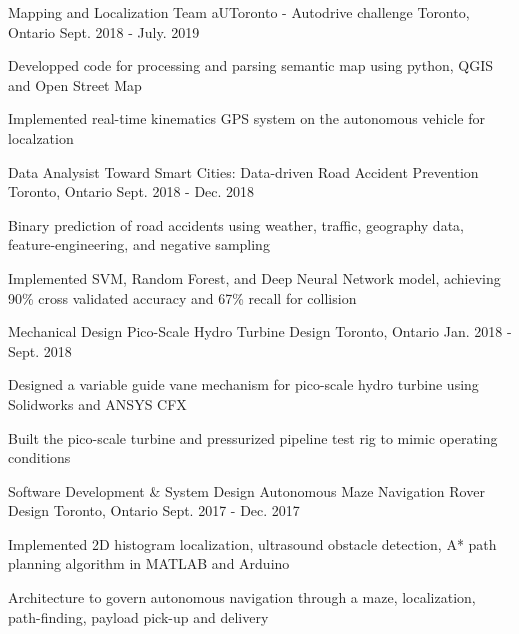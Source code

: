 \begin{cventries}
  \cventry
  {Mapping and Localization Team}
  {aUToronto - Autodrive challenge}
  {Toronto, Ontario}
  {Sept. 2018 - July. 2019}
  {
    \begin{cvitems}
      \item {Developped code for processing and parsing semantic map using python, QGIS and Open Street Map}
      \item {Implemented real-time kinematics GPS system on the autonomous vehicle for localzation}
    \end{cvitems}
  }

  \cventry
  {Data Analysist}
  {Toward Smart Cities: Data-driven Road Accident Prevention}
  {Toronto, Ontario}
  {Sept. 2018 - Dec. 2018}
  {
    \begin{cvitems}
      \item {Binary prediction of road accidents using weather, traffic, geography data, feature-engineering, and negative sampling}
      \item {Implemented SVM, Random Forest, and Deep Neural Network model, achieving 90\% cross validated accuracy and 67\% recall for collision}
    \end{cvitems}
  }

  \cventry
    {Mechanical Design}
    {Pico-Scale Hydro Turbine Design}
    {Toronto, Ontario}
    {Jan. 2018 - Sept. 2018}
    {
      \begin{cvitems}
        \item {Designed a variable guide vane mechanism for pico-scale hydro turbine using Solidworks and ANSYS CFX}
        \item {Built the pico-scale turbine and pressurized pipeline test rig to mimic operating conditions}
      \end{cvitems}
    }

    \cventry
    {Software Development \& System Design}
    {Autonomous Maze Navigation Rover Design}
    {Toronto, Ontario}
    {Sept. 2017 - Dec. 2017}
    {
      \begin{cvitems}
        \item {Implemented 2D histogram localization, ultrasound obstacle detection, A* path planning algorithm in MATLAB and Arduino}
        \item {Architecture to govern autonomous navigation through a maze, localization, path-finding, payload pick-up and delivery}
      \end{cvitems}
    }


\end{cventries}
